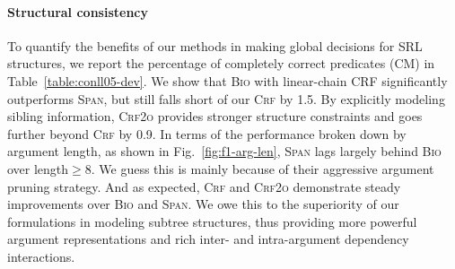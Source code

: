 \documentclass[11pt]{article}
\begin{document}
\paragraph{Structural consistency}
To quantify the benefits of our methods in making global decisions for SRL structures, we report the percentage of completely correct predicates (CM) \cite{he-etal-2018-jointly} in Table~\ref{table:conll05-dev}.
We show that \textsc{Bio} with linear-chain CRF significantly outperforms \textsc{Span}, but still falls short of our \textsc{Crf} by 1.5.
By explicitly modeling sibling information, \textsc{Crf2o} provides stronger structure constraints and goes further beyond \textsc{Crf} by 0.9.
In terms of the performance broken down by argument length, as shown in Fig.~\ref{fig:f1-arg-len}, \textsc{Span} lags largely behind \textsc{Bio} over length$\geq$8.
We guess this is mainly because of their aggressive argument pruning strategy.
And as expected, \textsc{Crf} and \textsc{Crf2o} demonstrate steady improvements over \textsc{Bio} and \textsc{Span}.
We owe this to the superiority of our formulations in modeling subtree structures, thus providing more powerful argument representations and rich inter- and intra-argument dependency interactions.
\end{document}
